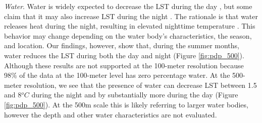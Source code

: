 \documentclass[final,3p,times,onecolumn,sort&compress]{elsarticle}
\begin{document}
\textit{Water}.
Water is widely expected to decrease the LST during the day \citep{Wicki2017-fv, Zhou2018-iy, Wang2019-water}, but some claim that it may also increase LST during the night \citep{Chun2017-mm}.
The rationale is that water releases heat during the night, resulting in elevated nighttime temperature \citep{Chun2017-mm}.
This behavior may change depending on the water body’s characteristics, the season, and location.
Our findings, however, show that, during the summer months, water reduces the LST during both the day and night (Figure \ref{fig:pdp_500}).
Although these results are not supported at the 100-meter resolution because 98\% of the data at the 100-meter level has zero percentage water.
At the 500-meter resolution, we see that the presence of water can decrease LST between 1.5 and 8$^oC$ during the night and by substantially more during the day (Figure \ref{fig:pdp_500}).
At the 500m scale this is likely referring to larger water bodies, however the depth and other water characteristics are not evaluated.
\end{document}
